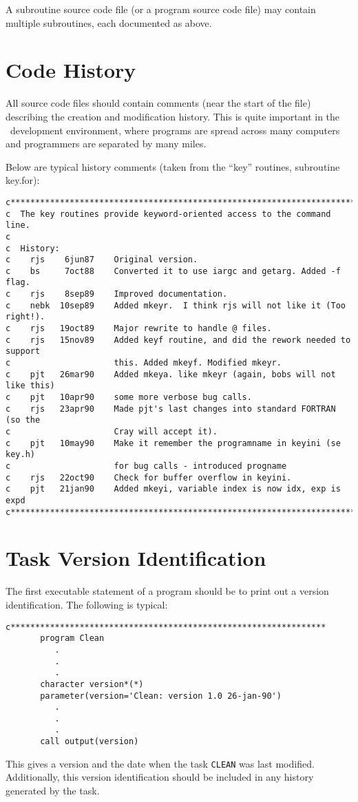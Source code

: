A subroutine source code file (or a program source code file) may contain
multiple subroutines, each documented as above.

\section{Code History}
All source code files should contain comments (near the start of the file)
describing the creation and modification history.  This is quite important
in the \miriad\ development environment, where programs are spread
across many computers and programmers are separated by many miles.

Below are typical history comments (taken from the ``key'' routines,
subroutine key.for):
{\small\begin{verbatim}
c************************************************************************
c  The key routines provide keyword-oriented access to the command line.
c
c  History:
c    rjs    6jun87    Original version.
c    bs     7oct88    Converted it to use iargc and getarg. Added -f flag.
c    rjs    8sep89    Improved documentation.
c    nebk  10sep89    Added mkeyr.  I think rjs will not like it (Too right!).
c    rjs   19oct89    Major rewrite to handle @ files.
c    rjs   15nov89    Added keyf routine, and did the rework needed to support
c                     this. Added mkeyf. Modified mkeyr.
c    pjt   26mar90    Added mkeya. like mkeyr (again, bobs will not like this)
c    pjt   10apr90    some more verbose bug calls.
c    rjs   23apr90    Made pjt's last changes into standard FORTRAN (so the
c                     Cray will accept it).
c    pjt   10may90    Make it remember the programname in keyini (se key.h)
c                     for bug calls - introduced progname
c    rjs   22oct90    Check for buffer overflow in keyini.
c    pjt   21jan90    Added mkeyi, variable index is now idx, exp is expd
c************************************************************************
\end{verbatim}}

\section{Task Version Identification}
The first executable statement of a program should be to print out a version
identification. The following is typical:
\begin{verbatim}
c****************************************************************
       program Clean
          .
          .
          .
       character version*(*)
       parameter(version='Clean: version 1.0 26-jan-90')
          .
          .
          .
       call output(version)
\end{verbatim}
This gives a version and the date when the task {\tt CLEAN} was last modified.
Additionally, this version identification should be included
in any history generated by the task.

